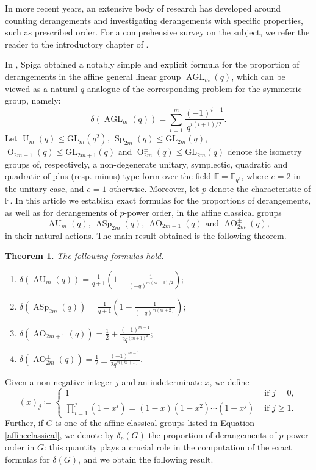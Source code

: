 \documentclass[a4paper, 12pt, oneside]{amsart}
\newtheorem{thm}[prop]{Theorem}
\theoremstyle{definition}
\newcommand{\GL}{\mathrm{GL}}
\DeclareMathOperator{\AGL}{AGL}
\DeclareMathOperator{\AU}{AU}
\DeclareMathOperator{\ASp}{ASp}
\DeclareMathOperator{\AO}{AO}
\DeclareMathOperator{\U}{U}
\DeclareMathOperator{\Sp}{Sp}
\DeclareMathOperator{\Or}{O}
\begin{document}
In more recent years, an extensive body of research has developed around counting derangements and investigating derangements with specific properties, such as prescribed order. For a comprehensive survey on the subject, we refer the reader to the introductory chapter of \cite{BurGiu}.

In \cite{SpigaAGL}, Spiga obtained a notably simple and explicit formula for the proportion of derangements in the affine general linear group $\AGL_m(q)$, which can be viewed as a natural $q$-analogue of the corresponding problem for the symmetric group, namely:
$$
\delta(\AGL_m(q))=\sum_{i=1}^{m}\frac{(-1)^{i-1}}{q^{i(i+1)/2}}.
$$
Let $\U_m(q) \le \GL_m(q^2)$, $\Sp_{2m}(q) \le \GL_{2m}(q)$, 
$\Or_{2m+1}(q) \le \GL_{2m+1}(q)$ and $\Or^{\pm}_{2m}(q) \le \GL_{2m}(q)$ denote the isometry groups of, respectively, a non-degenerate unitary, symplectic, quadratic and quadratic of plus (resp. minus) type form over the field $\mathbb{F}=\mathbb{F}_{q^e}$, where $e=2$ in the unitary case, and $e=1$ otherwise. Moreover, let $p$ denote the characteristic of $\mathbb{F}$. In this article we establish exact formulas for the proportions of derangements, as well as for derangements of $p$-power order, in the affine classical groups 
\begin{equation}
\label{affineclassical}
\AU_m(q)\text{, } \ASp_{2m}(q)\text{, } \AO_{2m+1}(q) \text{ and }\AO^{\pm}_{2m}(q),
\end{equation} 
in their natural actions.
The main result obtained is the following theorem.
\begin{thm}
\label{main}
The following formulas hold.
\begin{enumerate}
\item
\label{Unitary} 
$\displaystyle \delta(\AU_m(q))=\frac{1}{q+1}\left(1-\frac{1}{(-q)^{m(m+3)/2}}\right);$
\item
\label{Symplectic} 
$\displaystyle \delta(\ASp_{2m}(q))=\frac{1}{q+1}\left(1-\frac{1}{(-q)^{m(m+2)}}\right);$
\item
\label{Orthogonal_odd}
$\displaystyle \delta(\AO_{2m+1}(q))=\frac{1}{2}+ \frac{(-1)^{m-1}}{2q^{(m+1)^2}};$
\item
\label{Orthogonal_even}
$\displaystyle \delta(\AO^{\pm}_{2m}(q))=\frac{1}{2} \pm \frac{(-1)^{m-1}}{2q^{m(m+1)}}$.
\end{enumerate}
\end{thm}

Given a non-negative integer $j$ and an indeterminate $x$, we define
\begin{equation}
\label{(x)_j}
(x)_j \coloneqq \begin{cases}
    1 & \text{ if }j=0, \\
    \prod_{i=1}^j (1-x^i)=(1-x)(1-x^2)\cdots(1-x^j) & \text{ if } j \ge 1.
\end{cases}
\end{equation}
Further, if $G$ is one of the affine classical groups listed in  Equation \eqref{affineclassical}, we denote by $\delta_p(G)$ the proportion of derangements of $p$-power order in $G$: this quantity plays a crucial role in the computation of the exact formulas for $\delta(G)$, and we obtain the following result.
\end{document}
